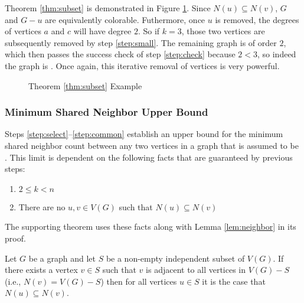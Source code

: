 Theorem \ref{thm:subset} is demonstrated in Figure \ref{fig:subset}.  Since \(N(u)\subseteq N(v)\), \(G\) and
\(G-u\) are equivalently colorable.  Futhermore, once \(u\) is removed, the degrees of vertices \(a\) and \(c\)
will have degree \(2\).  So if \(k=3\), those two vertices are subsequently removed by step \ref{step:small}.  The
remaining graph is of order \(2\), which then passes the success check of step \ref{step:check} because \(2<3\), so
indeed the graph is .  Once again, this iterative removal of vertices is very powerful.

\begin{figure}[h]
  \label{fig:subset}
  \begin{center}
  \end{center}
  \caption{Theorem \ref{thm:subset} Example}
\end{figure}

\subsubsection{Minimum Shared Neighbor Upper Bound}

Steps \ref{step:select}--\ref{step:common} establish an upper bound for the minimum shared neighbor count between
any two vertices in a graph that is assumed to be .  This limit is dependent on the following facts
that are guaranteed by previous steps:
\begin{enumerate}
\item \(2\le k<n\)
\item There are no \(u,v\in V(G)\) such that \(N(u)\subseteq N(v)\)
\end{enumerate}
The supporting theorem uses these facts along with Lemma \ref{lem:neighbor} in its proof.

\begin{lemma}
  \label{lem:neighbor}
  Let \(G\) be a graph and let \(S\) be a non-empty independent subset of \(V(G)\).  If there exists a vertex
  \(v\in S\) such that \(v\) is adjacent to all vertices in \(V(G)-S\) (i.e., \(N(v)=V(G)-S\)) then for all
  vertices \(u\in S\) it is the case that \(N(u)\subseteq N(v)\).
\end{lemma}

